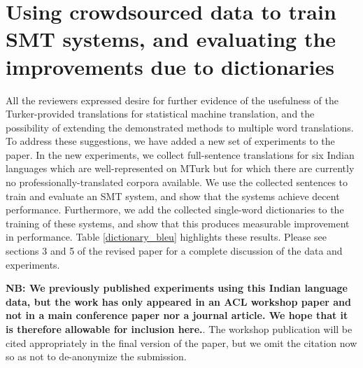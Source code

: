 \documentclass[11pt]{article}
\begin{document}

\section{Using crowdsourced data to train SMT systems, and evaluating the improvements due to dictionaries}\label{smt-results}

All the reviewers expressed desire for further evidence of the usefulness of the Turker-provided translations for statistical machine translation, and the possibility of extending the demonstrated methods to multiple word translations. 
To address these suggestions, we have added a new set of experiments to the paper.  In the new experiments, we collect full-sentence translations for six Indian languages which are well-represented on MTurk but for which there are currently no professionally-translated corpora available. We use the collected sentences to train and evaluate an SMT system, and show that the systems achieve decent performance. Furthermore, we add the collected single-word dictionaries to the training of these systems, and show that this produces measurable improvement in performance. Table \ref{dictionary_bleu} highlights these results. Please see sections 3 and 5 of the revised paper for a complete discussion of the data and experiments. 

{\bf NB: We previously published experiments using this Indian language data, but the work has only appeared in an ACL workshop paper and not in a main conference paper nor a journal article.  We hope that it is therefore allowable for inclusion here.}.   The workshop publication will be cited appropriately in the final version of the paper, but we omit the citation now so as not to de-anonymize the submission. 
\end{document}
